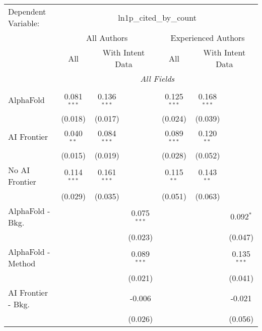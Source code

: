 \begingroup
\centering
\begin{tabular}{lcccccc}
   \tabularnewline \midrule \midrule
   Dependent Variable: & \multicolumn{6}{c}{ln1p\_cited\_by\_count}\\
 & \multicolumn{3}{c}{All Authors} & \multicolumn{3}{c}{Experienced Authors} \\
\cmidrule(lr){2-4} \cmidrule(lr){5-7}
 & \multicolumn{1}{c}{All} & \multicolumn{2}{c}{With Intent Data} & \multicolumn{1}{c}{All} & \multicolumn{2}{c}{With Intent Data} \\
\cmidrule(lr){2-2} \cmidrule(lr){3-4} \cmidrule(lr){5-5} \cmidrule(lr){6-7}
 & \multicolumn{6}{c}{\textit{All Fields}} \\ \\
   AlphaFold               & 0.081$^{***}$ & 0.136$^{***}$ &               & 0.125$^{***}$ & 0.168$^{***}$ &   \\   
                           & (0.018)       & (0.017)       &               & (0.024)       & (0.039)       &   \\   
   AI Frontier             & 0.040$^{**}$  & 0.084$^{***}$ &               & 0.089$^{***}$ & 0.120$^{**}$  &   \\   
                           & (0.015)       & (0.019)       &               & (0.028)       & (0.052)       &   \\   
   No AI Frontier          & 0.114$^{***}$ & 0.161$^{***}$ &               & 0.115$^{**}$  & 0.143$^{**}$  &   \\   
                           & (0.029)       & (0.035)       &               & (0.051)       & (0.063)       &   \\   
   AlphaFold - Bkg.        &               &               & 0.075$^{***}$ &               &               & 0.092$^{*}$\\   
                           &               &               & (0.023)       &               &               & (0.047)\\   
   AlphaFold - Method      &               &               & 0.089$^{***}$ &               &               & 0.135$^{***}$\\   
                           &               &               & (0.021)       &               &               & (0.041)\\   
   AI Frontier - Bkg.      &               &               & -0.006        &               &               & -0.021\\   
                           &               &               & (0.026)       &               &               & (0.056)\\   

\end{tabular}
